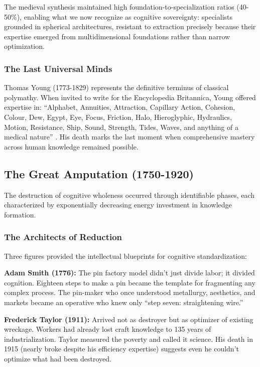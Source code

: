 The medieval synthesis maintained high foundation-to-specialization ratios (40-50\%), enabling what we now recognize as cognitive sovereignty: specialists grounded in spherical architectures, resistant to extraction precisely because their expertise emerged from multidimensional foundations rather than narrow optimization.

\subsubsection{The Last Universal Minds}

Thomas Young (1773-1829) represents the definitive terminus of classical polymathy. When invited to write for the Encyclopedia Britannica, Young offered expertise in: ``Alphabet, Annuities, Attraction, Capillary Action, Cohesion, Colour, Dew, Egypt, Eye, Focus, Friction, Halo, Hieroglyphic, Hydraulics, Motion, Resistance, Ship, Sound, Strength, Tides, Waves, and anything of a medical nature'' \citep{robinson2006}. His death marks the last moment when comprehensive mastery across human knowledge remained possible.

\subsection{The Great Amputation (1750-1920)}

The destruction of cognitive wholeness occurred through identifiable phases, each characterized by exponentially decreasing energy investment in knowledge formation.

\subsubsection{The Architects of Reduction}

Three figures provided the intellectual blueprints for cognitive standardization:

\textbf{Adam Smith (1776):} The pin factory model didn't just divide labor; it divided cognition. Eighteen steps to make a pin became the template for fragmenting any complex process. The pin-maker who once understood metallurgy, aesthetics, and markets became an operative who knew only ``step seven: straightening wire.''

\textbf{Frederick Taylor (1911):} Arrived not as destroyer but as optimizer of existing wreckage. Workers had already lost craft knowledge to 135 years of industrialization. Taylor measured the poverty and called it science. His death in 1915 (nearly broke despite his efficiency expertise) suggests even he couldn't optimize what had been destroyed.

